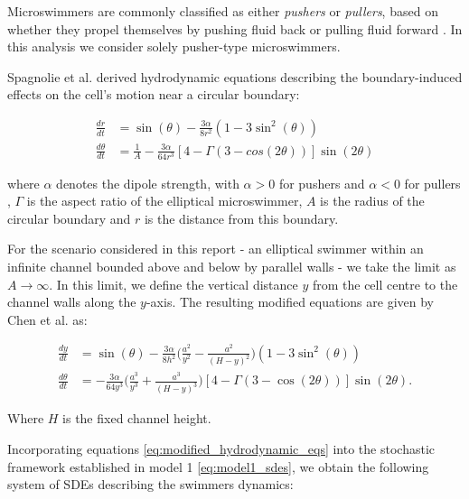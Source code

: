 Microswimmers are commonly classified as either 
\textit{pushers} or \textit{pullers}, based on whether they propel themselves by pushing fluid 
back or pulling fluid forward \cite{berke2008hydrodynamic}. In this analysis we consider solely pusher-type microswimmers.

Spagnolie et al. derived hydrodynamic equations describing the boundary-induced effects on the cell's motion
near a circular boundary:

\begin{subequations}
    \begin{align}\label{eq:hydrodynamic_circular_eqs}
        \frac{dr}{dt} &= \sin(\theta) - \frac{3\alpha}{8r^2}(1-3\sin^2(\theta)) \\
        \frac{d\theta}{dt} &= \frac{1}{A}-\frac{3\alpha}{64r^3}[4 - \Gamma(3-cos(2\theta))]\sin(2\theta)
    \end{align}        
\end{subequations}

where $\alpha$ denotes the dipole strength, with $\alpha > 0$ for pushers and $\alpha < 0$ for pullers 
\cite{berke2008hydrodynamic}, $\Gamma$ is the aspect ratio of the elliptical microswimmer, 
$A$ is the radius of the circular boundary and $r$ is the distance from this boundary.

For the scenario considered in this report - an elliptical swimmer within an infinite channel 
bounded above and below by parallel walls - we take the limit as $A \to \infty$.
In this limit, we define the vertical distance $y$ from the cell centre to the channel walls 
along the $y$-axis. The resulting modified equations are given by Chen et al. \cite{chen2021shape} as:

\begin{subequations}\label{eq:modified_hydrodynamic_eqs}
    \begin{align}
        \frac{dy}{dt} &= \sin(\theta) - \frac{3\alpha}{8h^2}
        \big(\frac{a^2}{y^2}-\frac{a^2}{(H - y)^2}\big)(1-3\sin^2(\theta)) \\
        \frac{d\theta}{dt} &= -\frac{3\alpha}{64y^3}\big(\frac{a^3}{y^3} + \frac{a^3}{(H-y)^3}\big)
        [4 - \Gamma(3-\cos(2\theta))]\sin(2\theta).
    \end{align}    
\end{subequations}

 Where $H$ is the fixed channel height. 
 
 Incorporating equations \eqref{eq:modified_hydrodynamic_eqs} into the stochastic framework
 established in model 1 \eqref{eq:model1_sdes}, we obtain the following system of SDEs describing 
 the swimmers dynamics:

